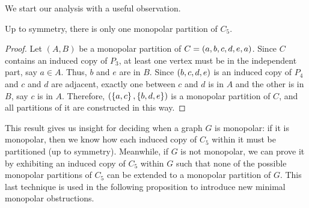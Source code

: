 We start our analysis with a useful observation.

\begin{proposition}
    \label{prop:partition_c5}
    Up to symmetry, there is only one monopolar partition of $C_5$.
\end{proposition}

\begin{proof}
    Let $(A,B)$ be a monopolar partition of $C= \left(a,b,c,d,e,a\right)$. Since $C$
    contains an induced copy of $P_3$, at least one vertex must be in the
    independent part, say $a\in A$. Thus, $b$ and $e$ are in $B$. Since
    $\left(b,c,d,e\right)$ is an induced copy of $P_4$ and $c$ and $d$ are adjacent,
    exactly one between $c$ and $d$ is in $A$ and the other is in $B$, say $c$
    is in $A$. Therefore, $(\left\{a,c\right\},\left\{b,d,e\right\})$ is a monopolar partition of $C$,
    and all partitions of it are constructed in this way.

\end{proof}

This result gives us insight for deciding when a graph $G$ is monopolar: if it
is monopolar, then we know how each induced copy of $C_5$ within it must be
partitioned (up to symmetry). Meanwhile, if $G$ is not monopolar, we can prove
it by exhibiting an induced copy of $C_5$ within $G$ such that none of the
possible monopolar partitions of $C_5$ can be extended to a monopolar partition
of $G$. This last technique is used in the following proposition to introduce
new minimal monopolar obstructions.

